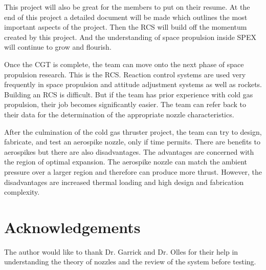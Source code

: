 \documentclass[conference]{IEEEtran} %
\begin{document}
This project will also be great for
the members to put on their resume. At the end of this project a detailed document will be made which outlines the most important aspects of the project.
Then the RCS will build off the momentum created by this project. And the understanding of space propulsion inside SPEX will continue to grow and flourish.

Once the CGT is complete, the team can move onto the next phase of space propulsion research. This is the RCS\@. Reaction control systems are used very
frequently in space propulsion and attitude adjustment systems as well as rockets. Building an RCS is difficult. But if the team
has prior experience with cold gas propulsion, their job becomes significantly easier. The team can refer back to their data for the determination of the
appropriate nozzle characteristics.

After the culmination of the cold gas thruster project, the team can try to design, fabricate, and test an aerospike nozzle, only if time permits.
There are benefits to aerospikes but there are also disadvantages. The advantages are concerned with the region of optimal expansion. The aerospike nozzle can match the
ambient pressure over a larger region and therefore can produce more thrust. However, the disadvantages are increased thermal loading and high design and fabrication complexity.

\section*{Acknowledgements}
The author would like to thank Dr. Garrick and Dr. Olles for their help in understanding the theory of nozzles and the review of the system before testing.


\onecolumn
\appendices{}
\end{document}
